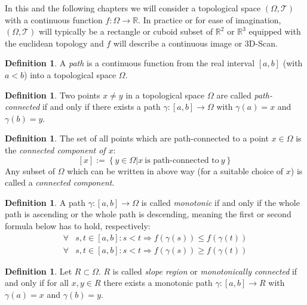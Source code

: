 \documentclass[a4paper,12pt,notitlepage,fullpage]{paper}
\theoremstyle{plain}
\theoremstyle{definition}
\newtheorem{defn}[thm]{Definition} %
\begin{document}

In this and the following chapters we will consider a topological space $(\Omega, \mathcal T)$ with a continuous function $f: \Omega \to \mathbb{R}$.
In practice or for ease of imagination, $(\Omega, \mathcal T)$ will typically be a rectangle or cuboid subset of $\mathbb R^2$ or $\mathbb R^3$ equipped with the euclidean topology and $f$ will describe a continuous image or 3D-Scan.

\begin{defn}
A \emph{path} is a continuous function from the real interval $[a,b]$ (with $a<b$) into a topological space $\Omega$.
\end{defn}


\begin{defn}
Two points $x\neq y$ in a topological space $\Omega$ are called \emph{path-connected} if and only if there exists a path $\gamma: [a,b] \to \Omega$ with $\gamma (a)=x$ and  $\gamma (b)=y$.
\end{defn}

\begin{defn}
The set of all points which are path-connected to a point $x\in\Omega$ is the \emph{connected component of $x$}:
$$[x]:=\left\{ y\in\Omega | x ~\text{is path-connected to}~ y \right\}$$
Any subset of $\Omega$ which can be written in above way (for a suitable choice of $x$) is called a \emph{connected component}.
\end{defn}

\begin{defn}
A path $\gamma: [a,b] \to \Omega$ is called \emph{monotonic} if and only if the whole path is ascending or the whole path is descending, meaning the first or second formula below has to hold, respectively:
\begin{align*}
\forall & s, t \in [a,b]: s < t \Rightarrow f(\gamma(s)) \leq f(\gamma(t))\\
\forall & s, t \in [a,b]: s < t \Rightarrow f(\gamma(s)) \geq f(\gamma(t))
\end{align*}
\end{defn}

\begin{defn}
Let $R \subset \Omega$. $R$ is called \emph{slope region} or \emph{monotonically connected} if and only if for all $x, y \in R$ there exists a monotonic path $\gamma: [a,b] \to R$ with $\gamma(a) = x$ and $\gamma(b) = y$.
\end{defn}
\end{document}
